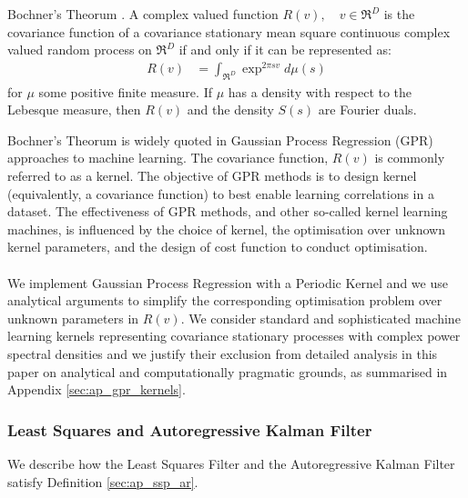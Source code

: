 \begin{thm} Bochner's Theorum \cite{rasmussen2006gaussian}. A complex valued  function $R(v), \quad v \in \Re^D$  is the covariance function of a covariance stationary mean square continuous complex valued random process on $\Re^D$ if and only if it can be represented as:  
\begin{align}
R(v) & = \int_{\Re^D} \exp^{2 \pi s v} d\mu(s) \label{eqn:bochnerthm}
\end{align}
for $\mu$ some positive finite measure. If $\mu$ has a density with respect to the Lebesque measure, then $R(v)$ and the density $S(s)$ are Fourier duals.
\end{thm}
Bochner's Theorum is widely quoted in Gaussian Process Regression (GPR) approaches to machine learning. The covariance function, $R(v)$ is commonly referred to as a kernel. The objective of GPR methods is to design kernel (equivalently, a covariance function) to best enable learning correlations in a dataset. The effectiveness of GPR methods, and other so-called kernel learning machines, is influenced by the choice of kernel, the optimisation over unknown kernel parameters, and the design of cost function to conduct optimisation. 
\\
\\
We implement Gaussian Process Regression with a Periodic Kernel and we use analytical arguments to simplify the corresponding optimisation problem over unknown parameters in $R(v)$. We consider standard and sophisticated machine learning kernels representing covariance stationary processes with complex power spectral densities and we justify their exclusion from detailed analysis in this paper on analytical and computationally pragmatic grounds, as summarised in Appendix \ref{sec:ap_gpr_kernels}. 

\subsubsection{Least Squares and Autoregressive Kalman Filter} \label{sec:ap_approxcov_lsakf}

We describe how the Least Squares Filter and the Autoregressive Kalman Filter satisfy Definition \ref{sec:ap_ssp_ar}.

